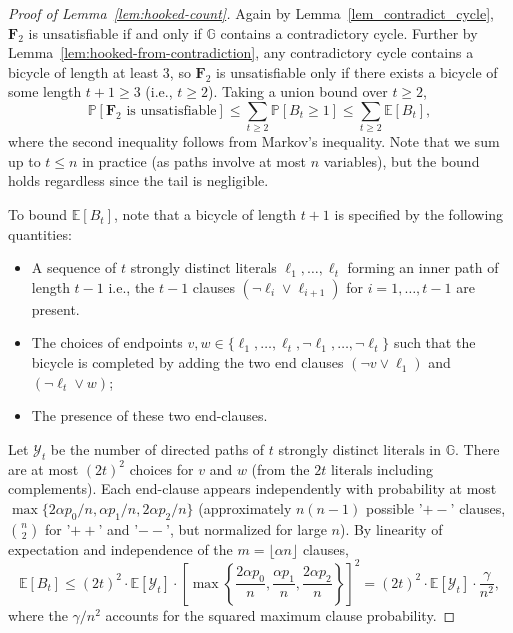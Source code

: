 \documentclass[11pt,reqno]{amsart}
\numberwithin{equation}{section}
\renewcommand{\vec}[1]{\boldsymbol{#1}}
\newcommand\cY{\mathcal Y}
\newcommand\vF{\vec F}
\newcommand\GG{\mathbb{G}}
\newcommand\pr{\mathbb{P}}
\renewcommand\Pr{\pr}
\newcommand\Lem{Lemma}
\def\pr{{\mathbb P}}
\begin{document}
    \begin{proof}[Proof of \Lem~\ref{lem:hooked-count}]
       	Again by Lemma~\ref{lem_contradict_cycle}, \(\vF_2\) is unsatisfiable if and only if \(\GG\) contains a contradictory cycle. 
       	Further by Lemma~\ref{lem:hooked-from-contradiction}, any contradictory cycle contains a bicycle of length at least 3, so \(\vF_2\) is unsatisfiable only if there exists a bicycle of some length \(t+1 \geq 3\) (i.e., \(t \geq 2\)). Taking a union bound over \(t \geq 2\),
       	\[
       	\Pr[\vF_2 \text{ is unsatisfiable}] \leq \sum_{t \geq 2} \Pr[B_t \geq 1] \leq \sum_{t \geq 2} \mathbb{E}[B_t],
       	\]
       	where the second inequality follows from Markov's inequality. Note that we sum up to \(t \leq n\) in practice (as paths involve at most \(n\) variables), but the bound holds regardless since the tail is negligible.
       	
       	To bound \(\mathbb{E}[B_t]\), note that a bicycle of length \(t+1\) is specified by the following quantities:
       	\begin{itemize}
       		\item A sequence of \(t\) strongly distinct literals \(\ell_1, \ldots, \ell_t\) forming an inner path of length \(t-1\) i.e., the \(t-1\) clauses \((\neg \ell_i \vee \ell_{i+1})\) for \(i=1,\dots,t-1\) are present.
       		\item The choices of endpoints \(v, w \in \{\ell_1,\ldots,\ell_t,\neg \ell_1,\ldots,\neg \ell_t\}\) such that the bicycle is completed by adding the two end clauses \((\neg v \vee \ell_1)\) and \((\neg \ell_t \vee w)\); 
       		\item The presence of these two end-clauses.
       	\end{itemize} 
       	
       	Let $\cY_t$ be the number of directed paths of $t$ strongly distinct literals in $\GG$. 
       	There are at most $(2t)^2$ choices for $v$ and $w$ (from the $2t$ literals including complements). 
       	Each end-clause appears independently with probability at most $\max\{2\alpha p_0 / n, \alpha p_1 / n, 2\alpha p_2 / n\}$ (approximately $n(n-1)$ possible '$+-$' clauses, $\binom{n}{2}$ for '$++$' and '$--$', but normalized for large $n$). 
       	By linearity of expectation and independence of the $m = \lfloor \alpha n \rfloor$ clauses,
       	\[
       	\mathbb{E}[B_t] \leq (2t)^2 \cdot \mathbb{E}[\cY_t] \cdot \left[ \max\left\{ \frac{2\alpha p_0}{n}, \frac{\alpha p_1}{n}, \frac{2\alpha p_2}{n} \right\} \right]^2 = (2t)^2 \cdot \mathbb{E}[\cY_t] \cdot \frac{\gamma}{n^2},
       	\]
       	where the \(\gamma / n^2\) accounts for the squared maximum clause probability.
       	

\end{proof}
\end{document}
